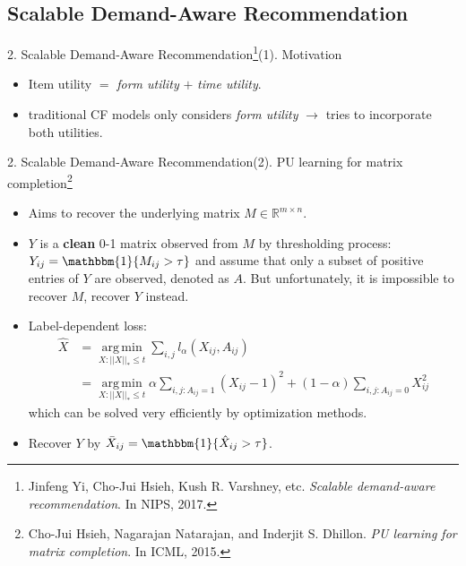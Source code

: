 \documentclass[professionalfonts]{beamer}
\DeclareMathOperator*{\argmin}{arg\,min}
\begin{document}
\subsection{Scalable Demand-Aware Recommendation\cite{Yi2017}}
\begin{frame}{2. Scalable Demand-Aware Recommendation\footnote{Jinfeng Yi, Cho-Jui Hsieh, Kush R. Varshney, etc. \textit{Scalable demand-aware recommendation}. In NIPS, 2017.}}{(1). Motivation}
\begin{itemize}
	\item Item utility $=$ \textit{form utility} $+$ \textit{time utility}.
	\item traditional CF models only considers \textit{form utility} $\rightarrow$ tries to incorporate both utilities.
\end{itemize}
\end{frame}

\begin{frame}{2. Scalable Demand-Aware Recommendation}{(2). PU learning for matrix completion\footnote{Cho-Jui Hsieh, Nagarajan Natarajan, and Inderjit S. Dhillon. \textit{PU learning for matrix completion}. In ICML, 2015.}}
\begin{itemize}
	\item Aims to recover the underlying matrix $M\in \mathbb{R}^{m\times n}$.
	\item $Y$ is a \textbf{clean} 0-1 matrix observed	from $M$ by thresholding process: $Y_{ij} = \mathbbm{1}\{M_{ij}>\tau\}$ and assume that only a subset of positive entries of $Y$ are observed, denoted as $A$. But unfortunately, it is impossible to recover $M$, recover $Y$ instead.
	\item Label-dependent loss:
		\begin{equation*}
		\begin{split}
			\hat{X} &= \argmin\limits_{X: ||X||_*\leq t} \sum_{i,j} \mathit{l}_\alpha(X_{ij}, A_{ij}) \\
				& = \argmin\limits_{X: ||X||_*\leq t} \alpha \sum_{i,j : A_{ij}=1}(X_{ij}-1)^2  + (1-\alpha)\sum_{i,j: A_{ij}=0}X_{ij}^2
		\end{split}
		\end{equation*}
	which can be solved very efficiently by optimization methods.
	\item Recover $Y$ by $\bar{X}_{ij} = \mathbbm{1}\{\hat{X}_{ij}>\tau\}$.
\end{itemize}
\end{frame}
\end{document}
